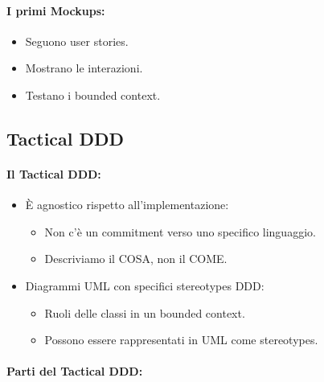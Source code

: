 
\paragraph{I primi Mockups:}

\begin{itemize}
	\item Seguono user stories.
	\item Mostrano le interazioni.
	\item Testano i bounded context.
\end{itemize}

\subsection{Tactical DDD}


\paragraph{Il Tactical DDD:}

\begin{itemize}
	\item È agnostico rispetto all'implementazione:
	      \begin{itemize}
		      \item Non c'è un commitment verso uno specifico linguaggio.
		      \item Descriviamo il COSA, non il COME.
	      \end{itemize}
	\item Diagrammi UML con specifici stereotypes DDD:
	      \begin{itemize}
		      \item Ruoli delle classi in un bounded context.
		      \item Possono essere rappresentati in UML come stereotypes.
	      \end{itemize}
\end{itemize}

\paragraph{Parti del Tactical DDD:}


